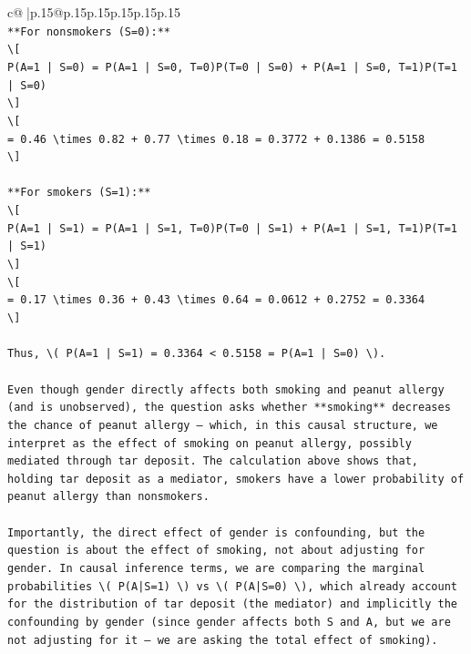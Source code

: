 \documentclass{article}
\begin{document}
{\begin{supertabular}{c@{$\;$}|p{.15\linewidth}@{}p{.15\linewidth}p{.15\linewidth}p{.15\linewidth}p{.15\linewidth}p{.15\linewidth}}
{{{\\ 
\texttt{**For nonsmokers (S=0):**} \\
\texttt{\textbackslash{}{[}} \\
\texttt{P(A=1 | S=0) = P(A=1 | S=0, T=0)P(T=0 | S=0) + P(A=1 | S=0, T=1)P(T=1 | S=0)} \\
\texttt{\textbackslash{}{]}} \\
\texttt{\textbackslash{}{[}} \\
\texttt{= 0.46 \textbackslash{}times 0.82 + 0.77 \textbackslash{}times 0.18 = 0.3772 + 0.1386 = 0.5158} \\
\texttt{\textbackslash{}{]}} \\
\\ 
\texttt{**For smokers (S=1):**} \\
\texttt{\textbackslash{}{[}} \\
\texttt{P(A=1 | S=1) = P(A=1 | S=1, T=0)P(T=0 | S=1) + P(A=1 | S=1, T=1)P(T=1 | S=1)} \\
\texttt{\textbackslash{}{]}} \\
\texttt{\textbackslash{}{[}} \\
\texttt{= 0.17 \textbackslash{}times 0.36 + 0.43 \textbackslash{}times 0.64 = 0.0612 + 0.2752 = 0.3364} \\
\texttt{\textbackslash{}{]}} \\
\\ 
\texttt{Thus, \textbackslash{}( P(A=1 | S=1) = 0.3364 < 0.5158 = P(A=1 | S=0) \textbackslash{}).} \\
\\ 
\texttt{Even though gender directly affects both smoking and peanut allergy (and is unobserved), the question asks whether **smoking** decreases the chance of peanut allergy — which, in this causal structure, we interpret as the effect of smoking on peanut allergy, possibly mediated through tar deposit. The calculation above shows that, holding tar deposit as a mediator, smokers have a lower probability of peanut allergy than nonsmokers.} \\
\\ 
\texttt{Importantly, the direct effect of gender is confounding, but the question is about the effect of smoking, not about adjusting for gender. In causal inference terms, we are comparing the marginal probabilities \textbackslash{}( P(A|S=1) \textbackslash{}) vs \textbackslash{}( P(A|S=0) \textbackslash{}), which already account for the distribution of tar deposit (the mediator) and implicitly the confounding by gender (since gender affects both S and A, but we are not adjusting for it — we are asking the total effect of smoking).} \\
}}}
\end{supertabular}}
\end{document}

